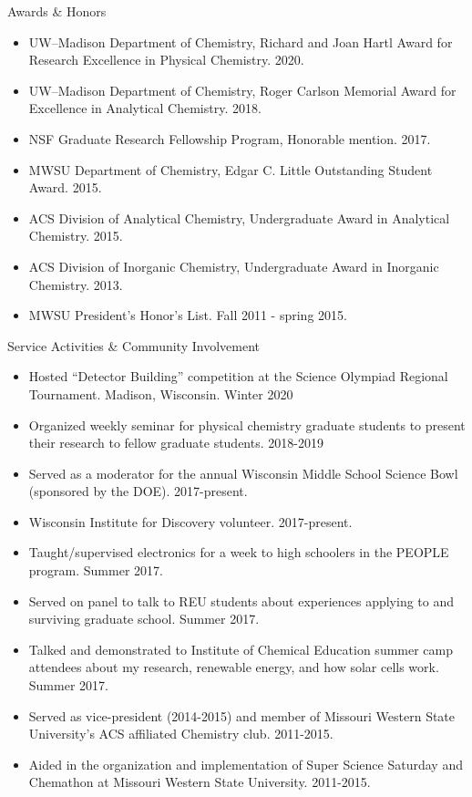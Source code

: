 \documentclass{resume} %
\begin{document}
\pagebreak
\begin{rSection}{Awards \& Honors}

\begin{itemize}[leftmargin = 0 pt]
	\item UW--Madison Department of Chemistry, Richard and Joan Hartl Award for Research Excellence in Physical Chemistry. 2020.
	\item UW--Madison Department of Chemistry, Roger Carlson Memorial Award for Excellence in Analytical Chemistry. 2018.
	\item NSF Graduate Research Fellowship Program, Honorable mention. 2017.
	\item MWSU Department of Chemistry, Edgar C. Little Outstanding Student Award. 2015.
	\item ACS Division of Analytical Chemistry, Undergraduate Award in Analytical Chemistry. 2015. 
	\item ACS Division of Inorganic Chemistry, Undergraduate Award in Inorganic Chemistry. 2013.
	\item MWSU President’s Honor’s List. Fall 2011 - spring 2015.
\end{itemize}

\end{rSection}





\begin{rSection}{Service Activities \& Community Involvement}

\begin{itemize}[leftmargin = 0 pt]
	\item Hosted ``Detector Building'' competition at the Science Olympiad Regional Tournament. Madison, Wisconsin. Winter 2020
	\item Organized weekly seminar for physical chemistry graduate students to present their research to fellow graduate students. 2018-2019
	\item Served as a moderator for the annual Wisconsin Middle School Science Bowl (sponsored by the DOE). 2017-present.
	\item Wisconsin Institute for Discovery volunteer. 2017-present. 
	\item Taught/supervised electronics for a week to high schoolers in the PEOPLE program. Summer 2017.
	\item Served on panel to talk to REU students about experiences applying to and surviving graduate school. Summer 2017.
	\item Talked and demonstrated to Institute of Chemical Education summer camp attendees about my research, renewable energy, and how solar cells work. Summer 2017.  
	\item Served as vice-president (2014-2015) and member of Missouri Western State University's ACS affiliated Chemistry club. 2011-2015.
	\item Aided in the organization and implementation of Super Science Saturday and Chemathon at Missouri Western State University. 2011-2015.	
\end{itemize}

\end{rSection}
\end{document}
